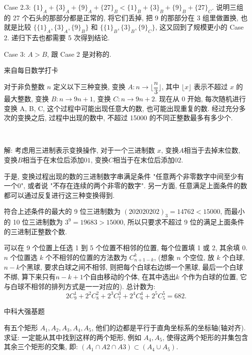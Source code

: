 Case 2.3: $\{1\}_A + \{3\}_A + \{9\}_A + \{27\}_B < \{1\}_B + \{3\}_B + \{9\}_B + \{27\}_C $. 说明三组的 27 个石头的那部分都是正常的, 将它们丢掉, 把 9 的那部分在 3 组里做置换, 也就是比较 $ \{\{1\}_A, \{3\}_A, \{9\}_B \} $ 和 $ \{\{1\}_B, \{3\}_B, \{9\}_C \} $, 这又回到了规模更小的 Case 2. 递归下去也都需要 5 次得到结论.

Case 3: $ A > B $, 跟 Case 2 是对称的.


\newpage
\noindent 来自每日数学打卡

对于非负整数 $n$ 定义以下三种变换, 变换 $ A: n \rightarrow \lfloor\dfrac{n}{3}\rfloor$, 其中 $\lfloor x\rfloor$ 表示不超过 $x$ 的最大整数, 变换 $B: n \rightarrow 9n+1$, 变换 $C: n \rightarrow 9n+2$. 现在从 $0$ 开始, 每次随机进行变换 A, B, C, 这个过程中可能出现任意大的数, 也可能出现重复的数. 经过充分多次的变换之后, 过程中出现的数中, 不超过 15000 的不同正整数最多有多少个.

~

解: 考虑用三进制表示变换操作, 对于一个三进制数 $x$, 变换$A$相当于去掉末位数, 变换$B$相当于在末位后添加$01$, 变换$C$相当于在末位后添加$02$.

于是, 变换过程出现的数的三进制数字串满足条件 "任意两个非零数字中间至少有一个0", 或者说 "不存在连续的两个非零的数字". 另一方面, 任意满足上面条件的数都可以通过反复进行这三种变换得到. 

符合上述条件的最大的 9 位三进制数为 $(202020202)_3 = 14762 < 15000 $, 而最小的 10 位三进制数为 $3^9=
19683 > 15000$, 所以只要求不超过 9 位的满足上面条件的三进制正整数个数.

可以在 9 个位置上任选 1 到 5 个位置不相邻的位置, 每个位置填 1 或 2, 其余填 0. $n$ 个位置选 $k$ 个不相邻的位置的方法数为 $C_{n+1-k}^{k}$, (想象 $n$ 个空位, 放 $k$ 个白球, $n-k$个黑球, 要求白球之间不相邻, 则把每个白球右边绑一个黑球, 最后一个白球不绑, 算下来只有$n-k+1$个自由移动的个体, 在其中选出$k$ 个作为白球的位置, 它与白球不相邻的排列方式是一一对应的). 总计数为:
\[ 2C_9^1 + 2^2 C_8^2 + 2^3 C_7^3 + 2^4 C_6^4 + 2^5 C_5^5 = 682 .\]

\newpage

\noindent 中科大强基题

有五个矩形 $A_1, A_2, A_3, A_4, A_5$, 他们的边都是平行于直角坐标系的坐标轴(轴对齐). 求证: 一定能从其中找到这样的两个矩形, 例如 $A_4, A_5$, 使得这两个矩形的并集包含其余三个矩形的交集, 即: $(A_1\cap A2\cap A3) \subset (A_4\cup A_5)$. 

